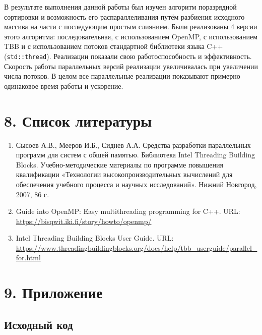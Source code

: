 \documentclass{report}
\begin{document}
    \par В результате выполнения данной работы был изучен алгоритм поразрядной сортировки и возможность его распараллеливания путём разбиения исходного массива на части с последующим простым слиянием.
         Были реализованы 4 версии этого алгоритма: последовательная, с использованием OpenMP, с использованием TBB и с использованием потоков стандартной библиотеки языка C++ (\verb|std::thread|).
         Реализации показали свою работоспособность и эффективность. Скорость работы параллельных версий реализации увеличивалась при увеличении числа потоков.
         В целом все параллельные реализации показывают примерно одинаковое время работы и ускорение.


    \newpage
    \section*{8. Список литературы}
    \begin{enumerate}
        \item Сысоев А.В., Мееров И.Б., Сиднев А.А. Средства разработки параллельных программ для систем с общей памятью. Библиотека Intel Threading Building Blocks. Учебно-методические материалы по программе повышения квалификации «Технологии высокопроизводительных вычислений для обеспечения учебного процесса и научных исследований». Нижний Новгород, 2007, 86 с.
        \item Guide into OpenMP: Easy multithreading programming for C++. URL: \url{https://bisqwit.iki.fi/story/howto/openmp/}
        \item Intel Threading Building Blocks User Guide. URL: \url{https://www.threadingbuildingblocks.org/docs/help/tbb_userguide/parallel_for.html}
    \end{enumerate}

    \newpage
    \section*{9. Приложение}

    \subsection*{Исходный код}
\end{document}
